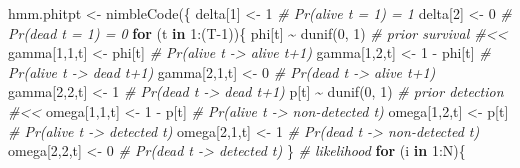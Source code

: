 \documentclass[
  12pt,
]{krantz}
\newenvironment{Shaded}{\begin{snugshade}}{\end{snugshade}}
\newcommand{\CommentTok}[1]{\textcolor[rgb]{0.56,0.35,0.01}{\textit{#1}}}
\newcommand{\ControlFlowTok}[1]{\textcolor[rgb]{0.13,0.29,0.53}{\textbf{#1}}}
\newcommand{\DecValTok}[1]{\textcolor[rgb]{0.00,0.00,0.81}{#1}}
\newcommand{\FunctionTok}[1]{\textcolor[rgb]{0.00,0.00,0.00}{#1}}
\newcommand{\NormalTok}[1]{#1}
\newcommand{\OtherTok}[1]{\textcolor[rgb]{0.56,0.35,0.01}{#1}}
\newcommand{\SpecialCharTok}[1]{\textcolor[rgb]{0.00,0.00,0.00}{#1}}
\begin{document}
\begin{Shaded}
\begin{Highlighting}[]
\NormalTok{hmm.phitpt }\OtherTok{\textless{}{-}} \FunctionTok{nimbleCode}\NormalTok{(\{}
\NormalTok{  delta[}\DecValTok{1}\NormalTok{] }\OtherTok{\textless{}{-}} \DecValTok{1}          \CommentTok{\# Pr(alive t = 1) = 1}
\NormalTok{  delta[}\DecValTok{2}\NormalTok{] }\OtherTok{\textless{}{-}} \DecValTok{0}          \CommentTok{\# Pr(dead t = 1) = 0}
  \ControlFlowTok{for}\NormalTok{ (t }\ControlFlowTok{in} \DecValTok{1}\SpecialCharTok{:}\NormalTok{(T}\DecValTok{{-}1}\NormalTok{))\{}
\NormalTok{    phi[t] }\SpecialCharTok{\textasciitilde{}} \FunctionTok{dunif}\NormalTok{(}\DecValTok{0}\NormalTok{, }\DecValTok{1}\NormalTok{) }\CommentTok{\# prior survival \#\textless{}\textless{}}
\NormalTok{    gamma[}\DecValTok{1}\NormalTok{,}\DecValTok{1}\NormalTok{,t] }\OtherTok{\textless{}{-}}\NormalTok{ phi[t]      }\CommentTok{\# Pr(alive t {-}\textgreater{} alive t+1)}
\NormalTok{    gamma[}\DecValTok{1}\NormalTok{,}\DecValTok{2}\NormalTok{,t] }\OtherTok{\textless{}{-}} \DecValTok{1} \SpecialCharTok{{-}}\NormalTok{ phi[t]  }\CommentTok{\# Pr(alive t {-}\textgreater{} dead t+1)}
\NormalTok{    gamma[}\DecValTok{2}\NormalTok{,}\DecValTok{1}\NormalTok{,t] }\OtherTok{\textless{}{-}} \DecValTok{0}        \CommentTok{\# Pr(dead t {-}\textgreater{} alive t+1)}
\NormalTok{    gamma[}\DecValTok{2}\NormalTok{,}\DecValTok{2}\NormalTok{,t] }\OtherTok{\textless{}{-}} \DecValTok{1}        \CommentTok{\# Pr(dead t {-}\textgreater{} dead t+1)}
\NormalTok{    p[t] }\SpecialCharTok{\textasciitilde{}} \FunctionTok{dunif}\NormalTok{(}\DecValTok{0}\NormalTok{, }\DecValTok{1}\NormalTok{) }\CommentTok{\# prior detection \#\textless{}\textless{}}
\NormalTok{    omega[}\DecValTok{1}\NormalTok{,}\DecValTok{1}\NormalTok{,t] }\OtherTok{\textless{}{-}} \DecValTok{1} \SpecialCharTok{{-}}\NormalTok{ p[t]    }\CommentTok{\# Pr(alive t {-}\textgreater{} non{-}detected t)}
\NormalTok{    omega[}\DecValTok{1}\NormalTok{,}\DecValTok{2}\NormalTok{,t] }\OtherTok{\textless{}{-}}\NormalTok{ p[t]        }\CommentTok{\# Pr(alive t {-}\textgreater{} detected t)}
\NormalTok{    omega[}\DecValTok{2}\NormalTok{,}\DecValTok{1}\NormalTok{,t] }\OtherTok{\textless{}{-}} \DecValTok{1}        \CommentTok{\# Pr(dead t {-}\textgreater{} non{-}detected t)}
\NormalTok{    omega[}\DecValTok{2}\NormalTok{,}\DecValTok{2}\NormalTok{,t] }\OtherTok{\textless{}{-}} \DecValTok{0}        \CommentTok{\# Pr(dead t {-}\textgreater{} detected t)}
\NormalTok{  \}}
  \CommentTok{\# likelihood}
  \ControlFlowTok{for}\NormalTok{ (i }\ControlFlowTok{in} \DecValTok{1}\SpecialCharTok{:}\NormalTok{N)\{}

\end{Highlighting}
\end{Shaded}
\end{document}
